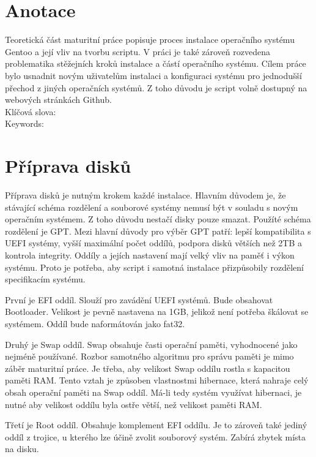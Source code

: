 \documentclass[12pt,a4paper,twoside,]{article}
\begin{document}
\newpage
\renewcommand{\contentsname}{\textsf{Obsah}}\tableofcontents

\newpage
\section{\textsf{Anotace}}
{Teoretická část maturitní práce popisuje proces instalace operačního systému Gentoo
	a její vliv na tvorbu scriptu. V práci je také zároveň rozvedena problematika stěžejních
	kroků instalace a částí operačního systému. Cílem práce bylo usnadnit novým uživatelům instalaci a konfiguraci
	systému pro jednodušší přechod z jiných operačních systémů. Z toho důvodu je script volně dostupný na webových stránkách Github. 
	\vspace{2cm}
	\\Klíčová slova:
	\\Keywords:
}


\newpage

\section{\textsf{Příprava disků}}
{Příprava disků je nutným krokem každé instalace. Hlavním důvodem je, 
že stávající schéma rozdělení a souborové systémy nemusí být v souladu s novým operačním systémem. 
Z toho důvodu nestačí disky pouze smazat. Použíté schéma rozdělení je GPT. 
Mezi hlavní důvody pro výběr GPT patří: lepší kompatibilita s UEFI systémy, 
vyšší maximální počet oddílů, podpora disků větších než 2TB a kontrola integrity.
Oddíly a jejích nastavení mají velký vliv na paměť i výkon systému. Proto je potřeba, 
aby script i samotná instalace přizpůsobily rozdělení specifikacím systému.} 

{První je EFI oddíl. Slouží pro zavádění UEFI systémů. Bude obsahovat Bootloader. 
Velikost je pevně nastavena na 1GB, jelikož není potřeba škálovat se systémem.
Oddíl bude naformátován jako fat32.}

{Druhý je Swap oddíl. Swap obsahuje časti operační paměti, vyhodnocené jako nejméně používané. 
Rozbor samotného algoritmu pro správu paměti je mimo záběr maturitní práce. Je třeba,
aby velikost Swap oddílu rostla s kapacitou paměti RAM. Tento vztah je způsoben vlastnostmi hibernace, 
která nahraje celý obsah operační paměti na Swap oddíl. Má-li tedy systém využívat hibernaci, je nutné
aby velikost oddílu byla ostře větší, než velikost paměti RAM. }

{Třetí je Root oddíl. Obsahuje komplement EFI oddílu. Je to zároveň také jediný oddíl z trojice, 
u kterého lze účině zvolit souborový systém. Zabírá zbytek místa na disku.}
\end{document}
